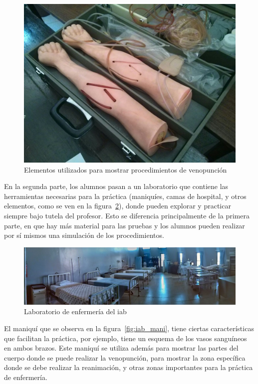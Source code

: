 \begin{figure}[h!t] 
\centering 
\includegraphics[scale=0.2,natwidth=100,natheight=100]{problema/iab_sala_2.jpg}
\caption{Elementos utilizados para mostrar procedimientos de venopunción}
\label{fig:iab_veno}
\end{figure}

En la segunda parte, los alumnos pasan a un laboratorio que contiene las
herramientas necesarias para la práctica (maniquíes, camas de hospital, y otros
elementos, como se ven en la figura~\ref{fig:iab_lab}), donde pueden explorar y
practicar siempre bajo tutela del profesor. Esto se diferencia
principalmente de la primera parte, en que hay más material para las pruebas y los
alumnos pueden realizar por sí mismos una simulación de los procedimientos.

\begin{figure}[h!t] 
\centering 
\includegraphics[scale=0.3,natwidth=100,natheight=100]{problema/iab_sala_1.jpg}
\caption{Laboratorio de enfermería del \Gls{iab}}
\label{fig:iab_lab}
\end{figure}


El maniquí que se observa en la figura~\ref{fig:iab_mani}, tiene ciertas
características que facilitan la práctica, por ejemplo, tiene un esquema de los
vasos sanguíneos en ambos brazos. Este maniquí se utiliza además para mostrar
las partes del cuerpo donde se puede realizar la venopunción, para mostrar la
zona específica donde se debe realizar la reanimación, y otras zonas importantes
para la práctica de enfermería.


